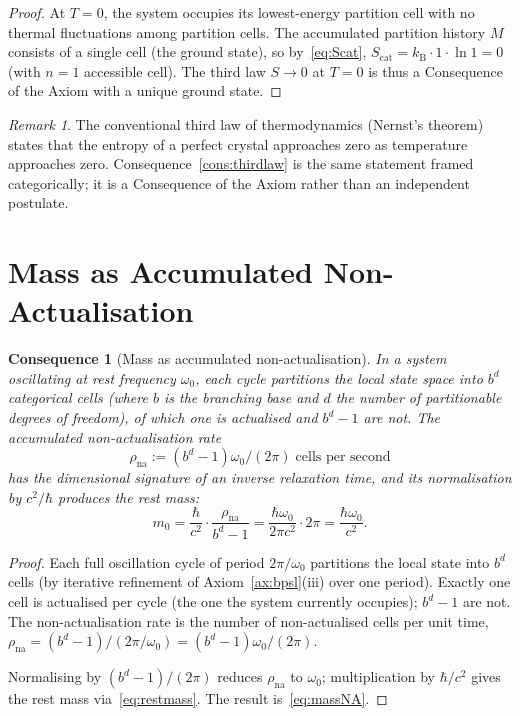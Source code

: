 \documentclass[11pt,twocolumn,a4paper]{article}
\theoremstyle{axiomstyle}
\theoremstyle{conseqstyle}
\newtheorem{consequence}{Consequence}
\theoremstyle{definition}
\theoremstyle{remark}
\newtheorem*{remark}{Remark}
\newcommand{\kB}{k_{\mathrm{B}}}
\begin{document}
\begin{proof}
At $T=0$, the system occupies its lowest-energy partition cell with no thermal fluctuations among partition cells. The accumulated partition history $M$ consists of a single cell (the ground state), so by~\eqref{eq:Scat}, $S_{\text{cat}}=\kB\cdot 1\cdot\ln 1=0$ (with $n=1$ accessible cell). The third law $S\to 0$ at $T=0$ is thus a Consequence of the Axiom with a unique ground state.
\end{proof}

\begin{remark}
The conventional third law of thermodynamics (Nernst's theorem) states that the entropy of a perfect crystal approaches zero as temperature approaches zero. Consequence~\ref{cons:thirdlaw} is the same statement framed categorically; it is a Consequence of the Axiom rather than an independent postulate.
\end{remark}

\section{Mass as Accumulated Non-Actualisation}
\label{sec:massmemory}

\begin{consequence}[Mass as accumulated non-actualisation]
\label{cons:massmemory}
In a system oscillating at rest frequency $\omega_{0}$, each cycle partitions the local state space into $b^{d}$ categorical cells (where $b$ is the branching base and $d$ the number of partitionable degrees of freedom), of which one is actualised and $b^{d}-1$ are not. The accumulated non-actualisation rate
\begin{equation}
\rho_{\text{na}}:=(b^{d}-1)\omega_{0}/(2\pi)\;\text{cells per second}
\label{eq:rateNA}
\end{equation}
has the dimensional signature of an inverse relaxation time, and its normalisation by $c^{2}/\hbar$ produces the rest mass:
\begin{equation}
m_{0}=\frac{\hbar}{c^{2}}\cdot\frac{\rho_{\text{na}}}{b^{d}-1}=\frac{\hbar\omega_{0}}{2\pi c^{2}}\cdot 2\pi=\frac{\hbar\omega_{0}}{c^{2}}.
\label{eq:massNA}
\end{equation}
\end{consequence}

\begin{proof}
Each full oscillation cycle of period $2\pi/\omega_{0}$ partitions the local state into $b^{d}$ cells (by iterative refinement of Axiom~\ref{ax:bpsl}(iii) over one period). Exactly one cell is actualised per cycle (the one the system currently occupies); $b^{d}-1$ are not. The non-actualisation rate is the number of non-actualised cells per unit time, $\rho_{\text{na}}=(b^{d}-1)/(2\pi/\omega_{0})=(b^{d}-1)\omega_{0}/(2\pi)$.

Normalising by $(b^{d}-1)/(2\pi)$ reduces $\rho_{\text{na}}$ to $\omega_{0}$; multiplication by $\hbar/c^{2}$ gives the rest mass via~\eqref{eq:restmass}. The result is~\eqref{eq:massNA}.
\end{proof}
\end{document}
